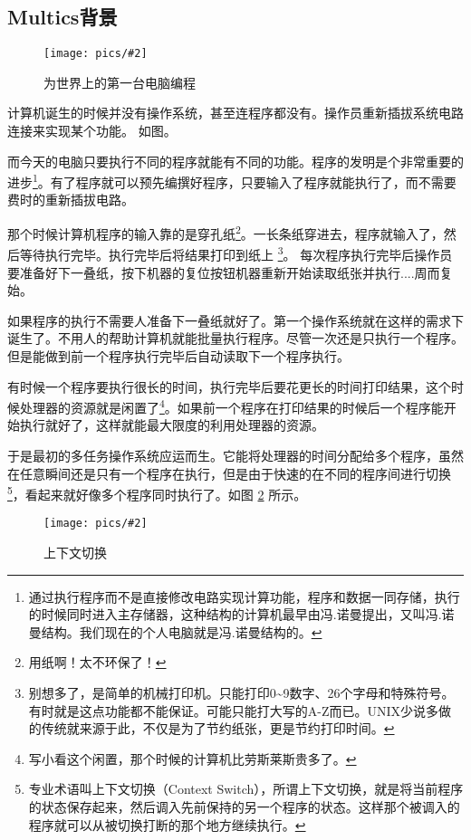 \documentclass[amstex]{ctexbook}
\newenvironment{insertnote}{ \ttfamily\CJKfamily{KaiTi} }{\vskip 1cm }
\newcommand{\chatu}[3][0.35]{%
\begin{figure}[h]%
\centering%
\texttt{[image: pics/\#2]}%
\caption{#3\label{fig:#2}}%
\end{figure}%
}
\begin{document}
\begin{insertnote}
\subsection*{Multics背景}

\chatu{TwoWomenOperatingENIAC}{为世界上的第一台电脑编程\protect\footnotemark}%


计算机诞生的时候并没有操作系统，甚至连程序都没有。操作员重新插拔系统电路连接来实现某个功能。
如图。

而今天的电脑只要执行不同的程序就能有不同的功能。程序的发明是个非常重要的进步\footnote{通过执行程序而不是直接修改电路实现计算功能，程序和数据一同存储，执行的时候同时进入主存储器，这种结构的计算机最早由冯.诺曼提出，又叫冯.诺曼结构。我们现在的个人电脑就是冯.诺曼结构的。}。有了程序就可以预先编撰好程序，只要输入了程序就能执行了，而不需要费时的重新插拔电路。

那个时候计算机程序的输入靠的是穿孔纸\footnote{用纸啊！太不环保了！}。一长条纸穿进去，程序就输入了，然后等待执行完毕。执行完毕后将结果打印到纸上
\footnote{别想多了，是简单的机械打印机。只能打印0\textasciitilde{}9数字、26个字母和特殊符号。有时就是这点功能都不能保证。可能只能打大写的A-Z而已。UNIX少说多做的传统就来源于此，不仅是为了节约纸张，更是节约打印时间。}。
每次程序执行完毕后操作员要准备好下一叠纸，按下机器的复位按钮机器重新开始读取纸张并执行....周而复始。

如果程序的执行不需要人准备下一叠纸就好了。第一个操作系统就在这样的需求下诞生了。不用人的帮助计算机就能批量执行程序。尽管一次还是只执行一个程序。但是能做到前一个程序执行完毕后自动读取下一个程序执行。

有时候一个程序要执行很长的时间，执行完毕后要花更长的时间打印结果，这个时候处理器的资源就是闲置了\footnote{写小看这个闲置，那个时候的计算机比劳斯莱斯贵多了。}。如果前一个程序在打印结果的时候后一个程序能开始执行就好了，这样就能最大限度的利用处理器的资源。

于是最初的多任务操作系统应运而生。它能将处理器的时间分配给多个程序，虽然在任意瞬间还是只有一个程序在执行，但是由于快速的在不同的程序间进行切换\footnote{专业术语叫上下文切换（Context Switch），所谓上下文切换，就是将当前程序的状态保存起来，然后调入先前保持的另一个程序的状态。这样那个被调入的程序就可以从被切换打断的那个地方继续执行。}，看起来就好像多个程序同时执行了。如图 \ref{fig:ContextSwitch}  所示。

\chatu[0.65]{ContextSwitch}{上下文切换}


\end{insertnote}
\end{document}
